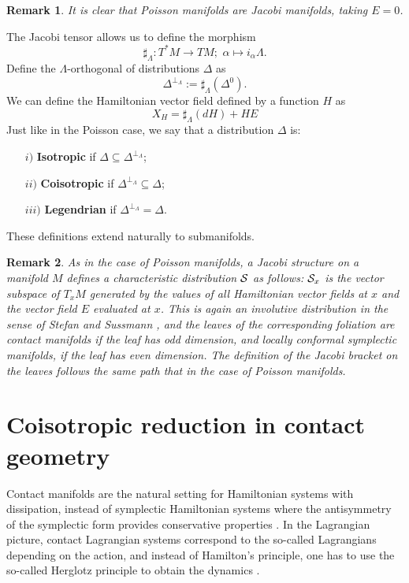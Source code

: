 \documentclass[12pt]{article}
\newtheorem{remark}{Remark}[section]
\newcommand{\sectiontitle}{section}
\newcommand{\setsectiontitle}[1]{\renewcommand{\sectiontitle}{\footnotesize\textit{#1}}}
\begin{document}
\begin{remark} {\rm
It is clear that Poisson manifolds are Jacobi manifolds, taking $E = 0$.}
\end{remark}


The Jacobi tensor allows us to define the morphism $$\sharp_\Lambda: T^*M \rightarrow TM;\,\, \alpha \mapsto i_{\alpha} \Lambda.$$ Define the $\Lambda$-orthogonal of distributions $\Delta$ as $$\Delta^{\perp_\Lambda} := \sharp_\Lambda(\Delta^0).$$
We can define the Hamiltonian vector field defined by a function $H$ as
$$
X_H = \sharp_{\Lambda}(dH) + H E
$$
Just like in the Poisson case, we say that a distribution $\Delta$ is:
\begin{itemize}
    \item[$i)$]\textbf{Isotropic} if $\Delta \subseteq \Delta^{\perp_\Lambda}$;
    \item[$ii)$]\textbf{Coisotropic} if $\Delta^{\perp_\Lambda} \subseteq \Delta$;
    \item[$iii)$]\textbf{Legendrian} if $\Delta^{\perp_\Lambda} = \Delta$.
\end{itemize}

These definitions extend naturally to submanifolds.\\

\begin{remark}{\rm 
    As in the case of Poisson manifolds, a Jacobi structure on a manifold $M$ defines a characteristic distribution ${\cal S}$ as follows:
    ${\cal S}_x$ is the vector subspace of $T_xM$ generated by the values of all Hamiltonian vector fields at $x$ and the vector field $E$ evaluated at $x$. This is again an involutive distribution in the sense of Stefan and Sussmann \cites{stefan,sussmann1973orbits}, and the leaves of the corresponding foliation are contact manifolds if the leaf has odd dimension, and locally conformal symplectic manifolds, if the leaf has even dimension. The definition of the Jacobi bracket on the leaves follows the same path that in the case of Poisson manifolds.}
\end{remark}
\section{Coisotropic reduction in contact geometry} \label{Contact}
\setsectiontitle{COISOTROPIC REDUCTION IN CONTACT GEOMETRY}

Contact manifolds are the natural setting for Hamiltonian systems with dissipation, instead of symplectic Hamiltonian systems where the antisymmetry of the symplectic form provides conservative properties \cites{bravetti0,de2019contact}. In the Lagrangian picture, contact Lagrangian systems correspond to the so-called Lagrangians depending on the action, and instead of Hamilton's principle, one has to use the so-called Herglotz principle to obtain the dynamics \cites{miguel}.\\
\end{document}
